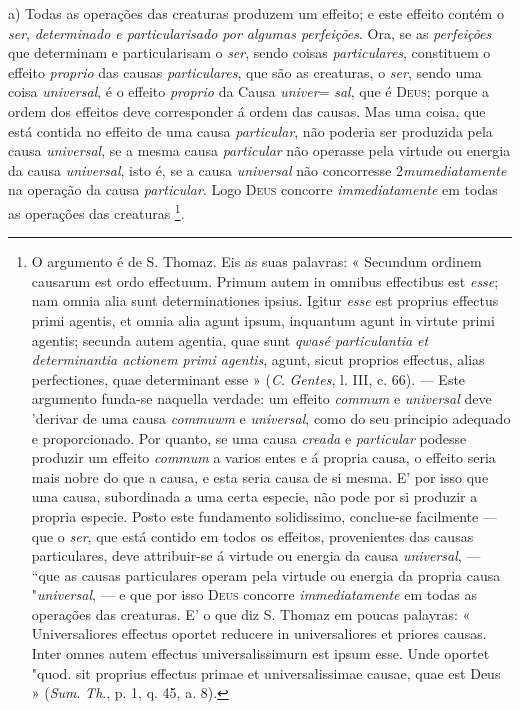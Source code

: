 a) Todas as operações das creaturas produzem um effeito; e este effeito contém o \emph{ser}, \emph{determinado e particularisado por algumas perfeições}. Ora, se as \emph{perfeições} que determinam e particularisam o \emph{ser}, sendo coisas \emph{particulares}, constituem o effeito \emph{proprio} das causas \emph{particulares}, que são as creaturas, o \emph{ser}, sendo uma coisa \emph{universal}, é o effeito \emph{proprio} da Causa \emph{univer}= \emph{sal}, que é \textsc{Deus}; porque a ordem dos effeitos deve corresponder á ordem das causas. Mas uma coisa, que está contida no effeito de uma causa \emph{particular}, não poderia ser produzida pela causa \emph{universal}, se a mesma causa \emph{particular} não operasse pela virtude ou energia da causa \emph{universal}, isto é, se a causa \emph{universal} não concorresse 2\emph{mumediatamente} na operação da causa \emph{particular}. Logo \textsc{Deus} concorre \emph{immediatamente} em todas as operações das creaturas \footnote{O argumento é de S. Thomaz. Eis as suas palavras: « Secundum ordinem causarum est ordo effectuum. Primum autem in omnibus effectibus est \emph{esse}; nam omnia alia sunt determinationes ipsius. Igitur \emph{esse} est proprius effectus primi agentis, et omnia alia agunt ipsum, inquantum agunt in virtute primi agentis; secunda autem agentia, quae sunt \emph{qwasé particulantia et determinantia actionem primi agentis}, agunt, sicut proprios effectus, alias perfectiones, quae determinant esse » (\emph{C}. \emph{Gentes}, l. III, c. 66). --- Este argumento funda-se naquella verdade: um effeito \emph{commum} e \emph{universal} deve 'derivar de uma causa \emph{commuwm} e \emph{universal}, como do seu principio adequado e proporcionado. Por quanto, se uma causa \emph{creada} e \emph{particular} podesse produzir um effeito \emph{commum} a varios entes e á propria causa, o effeito seria mais nobre do que a causa, e esta seria causa de si mesma. E' por isso que uma causa, subordinada a uma certa especie, não pode por si produzir a propria especie. Posto este fundamento solidissimo, conclue-se facilmente --- que o \emph{ser}, que está contido em todos os effeitos, provenientes das causas particulares, deve attribuir-se á virtude ou energia da causa \emph{universal}, --- “que as causas particulares operam pela virtude ou energia da propria causa "\emph{universal}, --- e que por isso \textsc{Deus} concorre \emph{immediatamente} em todas as operações das creaturas. E' o que diz S. Thomaz em poucas palayras: « Universaliores effectus oportet reducere in universaliores et priores causas. Inter omnes autem effectus universalissimurn est ipsum esse. Unde oportet "quod. sit proprius effectus primae et universalissimae causae, quae est Deus » (\emph{Sum}. \emph{Th}., p. 1, q. 45, a. 8).}.

